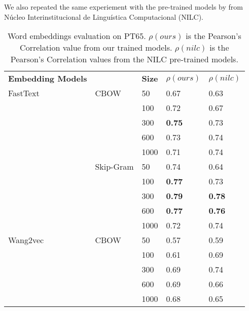 We also repeated the same experiement with the pre-trained models by  from Núcleo Interinstitucional de Linguística Computacional (NILC).


\begin{table}[]
\caption{Word embeddings evaluation on PT65. \textbf{$\rho(ours)$} is the Pearson’s Correlation value from our trained models. \textbf{$\rho(nilc)$} is the Pearson’s Correlation values from the NILC pre-trained models.}
\label{tab:evaluation:we}
\centering%
\begin{minipage}{.65\textwidth}
\begin{tabular}{@{}lllll@{}}
\cmidrule(r){1-5}
\textbf{Embedding Models} &      & \textbf{Size} & \textbf{$\rho(ours)$} & \textbf{$\rho(nilc)$} \\ \cmidrule(r){1-5}
FastText            & CBOW          & 50   & 0.67             & 0.63            \\
                    &               & 100  & 0.72             & 0.67            \\
                    &               & 300  & \textbf{0.75}    & 0.73            \\
                    &               & 600  & 0.73             & 0.74            \\
                    &               & 1000 & 0.71             & 0.74            \\ \cmidrule(lr){2-5}
                    & Skip-Gram     & 50   & 0.74             & 0.64            \\
                    &               & 100  & \textbf{0.77}    & 0.73            \\
                    &               & 300  & \textbf{0.79}    & \textbf{0.78}   \\
                    &               & 600  & \textbf{0.77}    & \textbf{0.76}   \\
                    &               & 1000 & 0.72             & 0.74            \\ \cmidrule(r){1-5}
Wang2vec            & CBOW          & 50   & 0.57             & 0.59            \\
                    &               & 100  & 0.61             & 0.69            \\
                    &               & 300  & 0.69             & 0.74            \\
                    &               & 600  & 0.69             & 0.66            \\
                    &               & 1000 & 0.68             & 0.65            \\ \cmidrule(lr){2-5}

\end{tabular}
\end{minipage}
\end{table}
